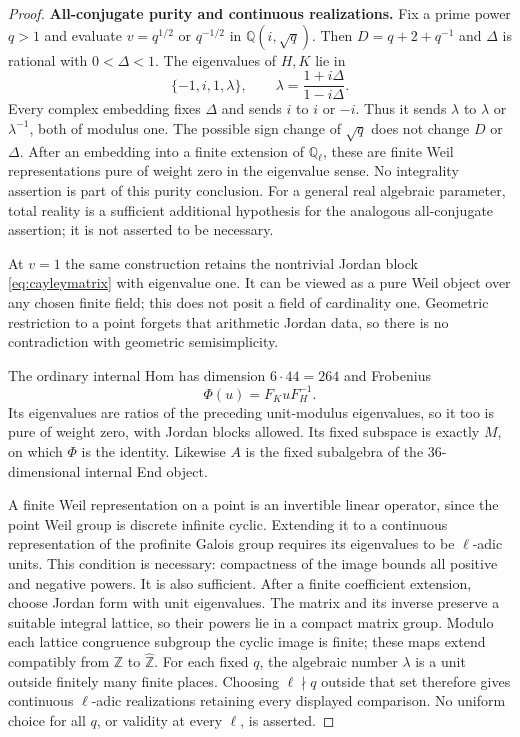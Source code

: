 \documentclass[11pt,a4paper]{article}
\newcommand{\Q}{\mathbb Q}\newcommand{\Z}{\mathbb Z}\newcommand{\C}{\mathbb C}\newcommand{\N}{\mathbb N}\newcommand{\F}{\mathbb F}
\theoremstyle{named}\newtheorem{finding}{Finding}[section]
\theoremstyle{definition}\newtheorem{definition}[finding]{Definition}
\theoremstyle{remark}\newtheorem{remark}[finding]{Remark}
\begin{document}
\begin{proof}
\par\smallskip\noindent\textbf{All-conjugate purity and continuous realizations.}\quad
Fix a prime power $q>1$ and evaluate $v=q^{1/2}$ or $q^{-1/2}$
in $\Q(i,\sqrt q)$. Then $D=q+2+q^{-1}$ and $\Delta$ is
rational with $0<\Delta<1$. The eigenvalues of $H,K$ lie in
\[
 \{-1,i,1,\lambda\},\qquad
 \lambda=\frac{1+i\Delta}{1-i\Delta}.
\]
Every complex embedding fixes $\Delta$ and sends $i$ to
$i$ or $-i$. Thus it sends $\lambda$ to $\lambda$ or
$\lambda^{-1}$, both of modulus one. The possible sign
change of $\sqrt q$ does not change $D$ or $\Delta$.
After an embedding into a finite extension of $\Q_\ell$,
these are finite Weil representations pure of weight zero
in the eigenvalue sense. No integrality assertion is
part of this purity conclusion.
For a general real algebraic parameter, total reality is a
sufficient additional hypothesis for the analogous all-conjugate
assertion; it is not asserted to be necessary.

At $v=1$ the same construction retains the nontrivial Jordan
block \eqref{eq:cayleymatrix} with eigenvalue one. It can be
viewed as a pure Weil object over any chosen finite field;
this does not posit a field of cardinality one.
Geometric restriction to a point forgets that arithmetic
Jordan data, so there is no contradiction with geometric
semisimplicity.

The ordinary internal Hom has dimension $6\cdot44=264$ and
Frobenius
\[
 \Phi(u)=F_KuF_H^{-1}.
\]
Its eigenvalues are ratios of the preceding unit-modulus
eigenvalues, so it too is pure of weight zero, with Jordan
blocks allowed. Its fixed subspace is exactly $M$, on which
$\Phi$ is the identity. Likewise $A$ is the fixed subalgebra
of the $36$-dimensional internal End object.

A finite Weil representation on a point is an invertible
linear operator, since the point Weil group is discrete
infinite cyclic. Extending it to a continuous representation
of the profinite Galois group requires its eigenvalues to be
$\ell$-adic units. This condition is necessary: compactness
of the image bounds all positive and negative powers.
It is also sufficient. After a finite coefficient extension,
choose Jordan form with unit eigenvalues. The matrix and
its inverse preserve a suitable integral lattice, so their
powers lie in a compact matrix group. Modulo each lattice
congruence subgroup the cyclic image is finite; these maps
extend compatibly from $\Z$ to $\widehat{\Z}$.
For each fixed $q$, the algebraic number $\lambda$ is a unit
outside finitely many finite places. Choosing
$\ell\nmid q$ outside that set therefore gives continuous
$\ell$-adic realizations retaining every displayed comparison.
No uniform choice for all $q$, or validity at every $\ell$,
is asserted.


\end{proof}
\end{document}
